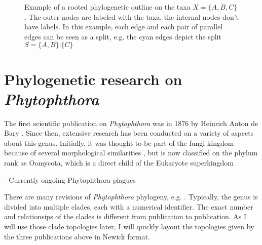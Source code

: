 \begin{figure}
  \centering
  \caption{Example of a rooted phylogenetic outline on the taxa $X = \{A, B,
  C\}$. The outer nodes are labeled with the taxa, the internal nodes don't have
  labels. In this example, each edge and each pair of parallel edges can be seen
  as a split, e.g. the cyan edges depict the split $S = \{A, B\} | \{C\}$}
  \label{fig:outlineExample}
\end{figure}

\section{Phylogenetic research on \textit{Phytophthora}} 

The first scientific publication on \textit{Phytophthora} was in 1876 by
Heinrich Anton de Bary \cite{kroonGenusPhytophthoraAnno2012} . Since then, extensive research has been conducted on
a variety of aspects about this genus. Initially, it was thought to be part of
the fungi kingdom because of several morphological similarities
, but is now classified on the phylum rank as Oomycota, which is
a direct child of the Eukaryote superkingdom .

- Currently ongoing Phytophthora plagues

There are many revisions of \textit{Phytophthora} phylogeny, e.g.
\cite{kroonGenusPhytophthoraAnno2012,yangExpandedPhylogenyGenus2017,abadPhytophthoraTaxonomicPhylogenetic2023a}.
Typically, the genus is divided into multiple clades, each with a numerical
identifier. The exact number and relationsips of the clades is different from
publication to publication. As I will use those clade topologies later, I will
quickly layout the topologies given by the three publications above in Newick
format.

